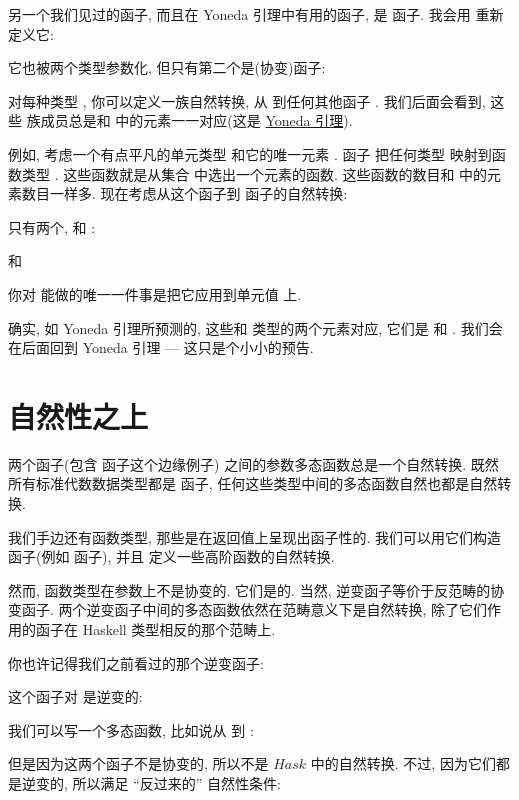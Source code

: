 另一个我们见过的函子, 而且在 Yoneda 引理中有用的函子, 是  函子. 我会用  重新定义它:

它也被两个类型参数化, 但只有第二个是(协变)函子:

对每种类型 , 你可以定义一族自然转换, 从  到任何其他函子 . 我们后面会看到, 这些
族成员总是和  中的元素一一对应(这是 \hyperref[the-yoneda-lemma]{Yoneda 引理}).

例如, 考虑一个有点平凡的单元类型 \code{()} 和它的唯一元素 \code{()}. 函子  把任何类型
 映射到函数类型 . 这些函数就是从集合  中选出一个元素的函数. 这些函数的数目和
 中的元素数目一样多. 现在考虑从这个函子到  函子的自然转换:

只有两个,  和 :

和

你对  能做的唯一一件事是把它应用到单元值 \code{()} 上.

确实, 如 Yoneda 引理所预测的, 这些和  类型的两个元素对应, 它们是  和
. 我们会在后面回到 Yoneda 引理 --- 这只是个小小的预告.

\section{自然性之上}

两个函子(包含  函子这个边缘例子) 之间的参数多态函数总是一个自然转换. 既然所有标准代数数据类型都是
函子, 任何这些类型中间的多态函数自然也都是自然转换.

我们手边还有函数类型, 那些是在返回值上呈现出函子性的. 我们可以用它们构造函子(例如  函子), 并且
定义一些高阶函数的自然转换.

然而, 函数类型在参数上不是协变的. 它们是的. 当然, 逆变函子等价于反范畴的协变函子.
两个逆变函子中间的多态函数依然在范畴意义下是自然转换, 除了它们作用的函子在 Haskell 类型相反的那个范畴上.

你也许记得我们之前看过的那个逆变函子:

这个函子对  是逆变的:

我们可以写一个多态函数, 比如说从  到 :

但是因为这两个函子不是协变的, 所以不是 $Hask$ 中的自然转换. 不过, 因为它们都是逆变的, 所以满足 ``反过来的''
自然性条件:

